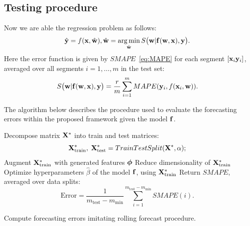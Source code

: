 \documentclass[conference]{IEEEtran}
\begin{document}
\subsection{Testing procedure}
Now we are able the regression problem as follows:
\begin{equation}\label{eq:regression_problem}
\hat{\y} = f(\x, \hat{\w}), \hat{\w} = \argmin_{\hat{\w}}S\bigl(\bw|\fx(\bw,\bx),\by\bigr). %
\end{equation}
Here the error function is given by $SMAPE$~\eqref{eq:MAPE} for each segment $[{\mathbf{x}}_i {\mathbf{y}}_i]$, averaged over all segments $i = 1, \dots, m$ in the test set:
\[ S\bigl(\mathbf{w}|{\mathbf{f}}(\mathbf{w},{\mathbf{x}}),{\mathbf{y}}\bigr) = \frac{r}{m}\sum_{i=1}^{m} MAPE({\mathbf{y}}_i, f({\mathbf{x}}_i, {\mathbf{w}})).\]

The algorithm below describes the procedure used to evaluate the forecasting errors within the proposed framework given the model ${\mathbf{f}}$.
\begin{algorithm}[!h]
 
 Decompose matrix ${\mathbf{X}}^{*}$ into train and test matrices:
 \[{\mathbf{X}}^{*}_{\text{train}}, \; {\mathbf{X}}^{*}_{\text{test}} = TrainTestSplit({\mathbf{X}}^{*}, \alpha);\]
 Augment ${\mathbf{X}}^{*}_{\text{train}}$ with generated features ${\boldsymbol{\phi}}$ \;
 Reduce dimensionality of ${\mathbf{X}}^{*}_{\text{train}}$ \;
 Optimize hyperparameters $\hat{\beta}$ of the model ${\mathbf{f}}$, using ${\mathbf{X}}^{*}_{\text{train}}$\;
  Return $SMAPE$, averaged over data splits:
  \[ \text{Error}  = \frac{1}{m_{\text{test}} - m_{\min}} \sum_{i=1}^{m_{\text{test}} - m_{\min}} {SMAPE}(i).\]
  \bigskip
 \caption{Compute forecasting errors imitating rolling forecast procedure.}\label{alg:train_test_rmse}
\end{algorithm}
\end{document}
